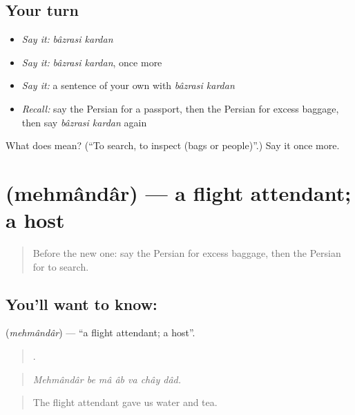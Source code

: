 \subsection*{Your turn}
\begin{itemize}
\raggedright
  \item \emph{Say it:} \emph{bâzrasi kardan}
  \item \emph{Say it:} \emph{bâzrasi kardan}, once more
  \item \emph{Say it:} a sentence of your own with \emph{bâzrasi kardan}
  \item \emph{Recall:} say the Persian for a passport, then the Persian for excess baggage, then say \emph{bâzrasi kardan} again
\end{itemize}

\begin{tcolorbox}[breakable,colback=teal!4,colframe=teal!35!black,title={Before you move on}]
What does   mean? (\textquotedblleft{}To search, to inspect (bags or people)\textquotedblright{}.) Say it once more.
\end{tcolorbox}
\section[\texorpdfstring{\fa{مهماندار} (mehmândâr)}{مهماندار (mehmândâr)}]{ (mehmândâr) — a flight attendant; a host}

\label{lesson:FA-C432-mehmandar}



\begin{quote}
Before the new one: say the Persian for excess baggage, then the Persian for to search.
\end{quote}

\subsection*{You'll want to know: }
\textbf{} (\emph{mehmândâr}) — \textquotedblleft{}a flight attendant; a host\textquotedblright{}.

\begin{quote}
      .
\end{quote}

\begin{quote}
\emph{Mehmândâr be mâ âb va chây dâd.}
\end{quote}

\begin{quote}
The flight attendant gave us water and tea.
\end{quote}

